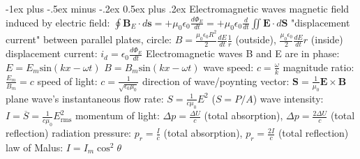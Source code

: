 \documentclass[10pt,landscape]{article}
\makeatletter
\renewcommand{\subsection}{\@startsection{subsection}{2}{0mm}%
                                {-1ex plus -.5ex minus -.2ex}%
                                {0.5ex plus .2ex}%
                                {\normalfont\normalsize\bfseries}}
\newcommand{\spc}{\hspace*{1em}}
\makeatother
\begin{document}
\begin{multicols*}{3}
\subsection{Electromagnetic waves}
magnetic field induced by electric field: $\oint \mathbf{B}_E\cdot d\mathbf{s}=+\mu _0\epsilon _0\frac{d\Phi _E}{dt}=+\mu _0\epsilon _0\frac{d}{dt}\iint\mathbf{E}\cdot d\mathbf{S}$
\newline
"displacement current" between parallel plates, circle: 
\newline
\spc $B=\frac{\mu _0\epsilon _0R^2}{2}\frac{dE}{dt}\frac{1}{r}$ (outside), $\frac{\mu _0\epsilon _0}{2}\frac{dE}{dt}r$ (inside)
\newline
displacement current: $i_d=\epsilon _0\frac{d\Phi _E}{dt}$
\newline \newline
Electromagnetic waves
\newline
\spc B and E are in phase:
\newline
\spc\spc $E=E_m\mathrm{sin}(kx-\omega t)$
\newline
\spc\spc $B=B_m\mathrm{sin}(kx-\omega t)$
\newline
\spc wave speed: $c=\frac{\omega }{k}$
\newline
\spc magnitude ratio: $\frac{E_m}{B_m}=c$
\newline
\spc speed of light: $c=\frac{1}{\sqrt{\epsilon _0\mu _0}}$
\newline
\spc direction of wave/poynting vector: $\mathbf{S}=\frac{1}{\mu _0}\mathbf{E}\times \mathbf{B}$
\newline \newline
plane wave's instantaneous flow rate: $S=\frac{1}{c\mu _0}E^2$ ($S=P/A$)
\newline
wave intensity: $I=\overline{S}=\frac{1}{c\mu _0}E_{\textrm{rms}}^2$
\newline
momentum of light: 
\newline
\spc $\Delta p=\frac{\Delta U}{c}$ (total absorption), $\Delta p=\frac{2\Delta U}{c}$ (total reflection)
\newline
radiation pressure:
\newline
\spc $p_r=\frac{I}{c}$ (total absorption), $p_r=\frac{2I}{c}$ (total reflection)
\newline
law of Malus: $I=I_m \cos ^2\theta $


\end{multicols*}
\end{document}
